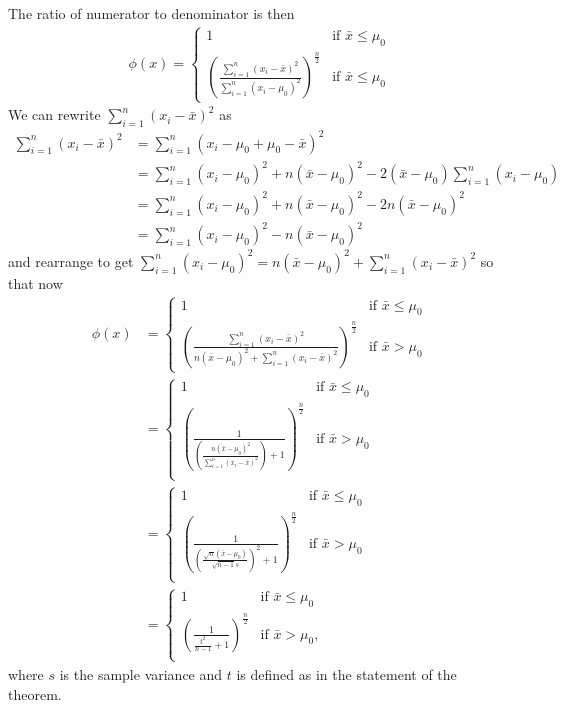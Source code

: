 \documentclass[11pt]{article} %
\begin{document}
The ratio of numerator to denominator is then 
\begin{align*}
\phi(x)=\begin{cases} 
1 & \text{if $\bar{x}\le \mu_0$}\\
\left(\frac{\sum_{i=1}^n (x_i-\bar{x})^2}{ \sum_{i=1}^n (x_i - \mu_0)^2}\right)^{\frac{n}2} & \text{if $\bar{x}\le \mu_0$}
\end{cases}
\end{align*}
We can rewrite $\sum_{i = 1}^n (x_i-\bar{x})^2 $ as 
\begin{align*}
\sum_{i = 1}^n (x_i-\bar{x})^2 & = \sum_{i = 1}^n (x_i-\mu_0  +\mu_0 - \bar{x})^2 \\
& = \sum_{i = 1}^n (x_i-\mu_0)^2 + n (\bar{x} - \mu_0)^2 - 2(\bar{x} - \mu_0)\sum_{i = 1}^n (x_i-\mu_0)\\
& = \sum_{i = 1}^n (x_i-\mu_0)^2 + n (\bar{x} - \mu_0)^2 - 2n(\bar{x}- \mu_0)^2\\
& = \sum_{i = 1}^n (x_i-\mu_0)^2 - n (\bar{x} - \mu_0)^2
\end{align*} 
and rearrange to get $ \sum_{i = 1}^n (x_i-\mu_0)^2 = n (\bar{x} - \mu_0)^2 + \sum_{i = 1}^n (x_i-\bar{x})^2 $
so that now 
\begin{align*}
\phi(x)&=\begin{cases} 
1 & \text{if $\bar{x}\le \mu_0$}\\
\left(\frac{\sum_{i=1}^n (x_i-\bar{x})^2}{ n (\bar{x} - \mu_0)^2 + \sum_{i = 1}^n (x_i-\bar{x})^2}\right)^{\frac{n}2} & \text{if $\bar{x}> \mu_0$}
\end{cases}\\
& = \begin{cases} 
1 & \text{if $\bar{x}\le \mu_0$}\\
\left(\frac{1}{ \left(\frac{n(\bar{x} - \mu_0)^2}{\sum_{i=1}^n (x_i-\bar{x})^2} \right)+ 1}\right)^{\frac{n}2} & \text{if $\bar{x}> \mu_0$}\\ 
\end{cases}\\
& = \begin{cases} 
1 & \text{if $\bar{x}\le \mu_0$}\\
\left(\frac{1}{\left(\frac{\sqrt{n}(\bar{x}-\mu_0)}{\sqrt{n-1}s}\right)^2+ 1}\right)^{\frac{n}2} & \text{if $\bar{x}> \mu_0$}\\ 
\end{cases}\\
& = \begin{cases} 
1 & \text{if $\bar{x}\le \mu_0$}\\
\left(\frac{1}{\frac{t^2}{n-1}+ 1}\right)^{\frac{n}2} & \text{if $\bar{x}> \mu_0$},\\ 
\end{cases}
\end{align*} where $s$ is the sample variance and $t$ is defined as in the statement of the theorem. 
\end{document}
